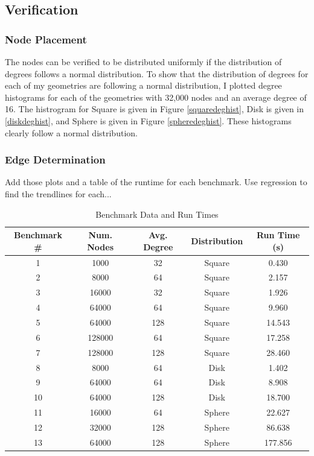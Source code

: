 \documentclass{article}
\begin{document}
    \subsection{Verification}

        \subsubsection{Node Placement}
        The nodes can be verified to be distributed uniformly if the distribution of degrees follows a normal distribution. To show that the distribution of degrees for each of my geometries are following a normal distribution, I plotted degree histograms for each of the geometries with 32,000 nodes and an average degree of 16. The histrogram for Square is given in Figure \ref{squaredeghist}, Disk is given in \ref{diskdeghist}, and Sphere is given in Figure \ref{spheredeghist}. These histograms clearly follow a normal distribution.

        \subsubsection{Edge Determination}
        Add those plots and a table of the runtime for each benchmark. Use regression to find the trendlines for each...

        \begin{center}
            \begin{table}
                \centering
                \begin{tabular}{|c|c|c|c|c|}
                    \hline
                    Benchmark \# & Num. Nodes & Avg. Degree & Distribution & Run Time (s)\\
                    \hline
                    1 & 1000 & 32 & Square & 0.430 \\
                    2 & 8000 & 64 & Square & 2.157 \\
                    3 & 16000 & 32 & Square & 1.926 \\
                    4 & 64000 & 64 & Square & 9.960 \\
                    5 & 64000 & 128 & Square & 14.543 \\
                    6 & 128000 & 64 & Square & 17.258 \\
                    7 & 128000 & 128 & Square & 28.460 \\
                    8 & 8000 & 64 & Disk & 1.402 \\
                    9 & 64000 & 64 & Disk & 8.908 \\
                    10 & 64000 & 128 & Disk & 18.700 \\
                    11 & 16000 & 64 & Sphere & 22.627 \\
                    12 & 32000 & 128 & Sphere & 86.638 \\
                    13 & 64000 & 128 & Sphere & 177.856 \\
                    \hline
                \end{tabular}
                \caption{Benchmark Data and Run Times}
                \label{tab1}
            \end{table}
        \end{center}
\end{document}
